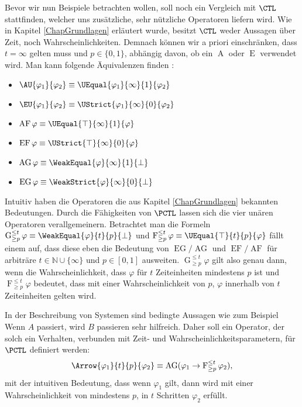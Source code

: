 Bevor wir nun Beispiele betrachten wollen, soll noch ein Vergleich mit $\CTL$ stattfinden, welcher uns zusätzliche, sehr nützliche Operatoren liefern wird. 
Wie in Kapitel \ref{ChapGrundlagen} erläutert wurde, besitzt $\CTL$ weder Aussagen über Zeit, noch Wahrscheinlichkeiten. 
Demnach können wir a priori einschränken, dass $t=\infty$ gelten muss und $p\in\{0,1\}$, abhängig davon, ob ein $\operatorname{A}$ oder $\operatorname{E}$ verwendet wird.
Man kann folgende Äquivalenzen finden \cite{hansson1994logic}:
\begin{itemize}
	\item $\AU{\varphi_1}{\varphi_2} \equiv \UEqual{\varphi_1}{\infty}{1}{\varphi_2}$
	\item $\EU{\varphi_1}{\varphi_2} \equiv \UStrict{\varphi_1}{\infty}{0}{\varphi_2}$
	\item $\operatorname{AF}\varphi \equiv \UEqual{\top}{\infty}{1}{\varphi}$
	\item $\operatorname{EF}\varphi \equiv \UStrict{\top}{\infty}{0}{\varphi}$
	\item $\operatorname{AG}\varphi \equiv \WeakEqual{\varphi}{\infty}{1}{\bot}$
	\item $\operatorname{EG}\varphi \equiv \WeakStrict{\varphi}{\infty}{0}{\bot}$
\end{itemize}
Intuitiv haben die Operatoren die aus Kapitel \ref{ChapGrundlagen} bekannten Bedeutungen.
Durch die Fähigkeiten von $\PCTL$ lassen sich die vier unären Operatoren verallgemeinern. 
Betrachtet man die Formeln $\operatorname{G}^{\leq t}_{\geq p}\varphi \equiv \WeakEqual{\varphi}{t}{p}{\bot}$ und $\operatorname{F}^{\leq t}_{\geq p}\varphi \equiv \UEqual{\top}{t}{p}{\varphi}$ fällt einem auf, dass diese eben die Bedeutung von $\operatorname{EG}/\operatorname{AG}$ und $\operatorname{EF}/\operatorname{AF}$ für arbiträre $t\in \mathbb{N}\cup\{\infty\}$ und $p\in [0,1]$ ausweiten. 
$\operatorname{G}^{\leq t}_{\geq p}\varphi$ gilt also genau dann, wenn die Wahrscheinlichkeit, dass $\varphi$ für $t$ Zeiteinheiten mindestens $p$ ist und $\operatorname{F}^{\leq t}_{\geq p}\varphi$ bedeutet, dass mit einer Wahrscheinlichkeit von $p$, $\varphi$ innerhalb von $t$ Zeiteinheiten gelten wird. \cite{hansson1994logic}

In der Beschreibung von Systemen sind bedingte Aussagen wie zum Beispiel \glqq Wenn $A$ passiert, wird $B$ passieren\grqq{} sehr hilfreich. Daher soll ein Operator, der solch ein Verhalten, verbunden mit Zeit- und Wahrscheinlichkeitsparametern, für $\PCTL$ definiert werden:
$$\Arrow{\varphi_1}{t}{p}{\varphi_2} \equiv \operatorname{AG}(\varphi_1\rightarrow\operatorname{F}^{\leq t}_{\geq p} \varphi_2),$$
mit der intuitiven Bedeutung, dass wenn $\varphi_1$ gilt, dann wird mit einer Wahrscheinlichkeit von mindestens $p$, in $t$ Schritten $\varphi_2$ erfüllt. \cite{hansson1994logic}

